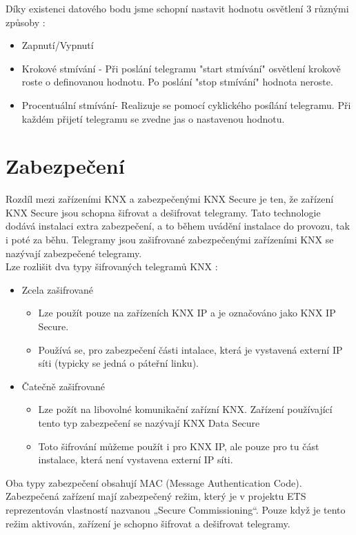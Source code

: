 Díky existenci datového bodu jsme schopní nastavit hodnotu osvětlení 3 různými způsoby \cite{Systemove Argumenty}:
\begin{itemize}
    \item Zapnutí/Vypnutí
    \item Krokové stmívání - Při poslání telegramu "start stmívání" osvětlení krokově roste o definovanou hodnotu. Po poslání "stop stmívání" hodnota neroste.
    \item Procentuální stmívání- Realizuje se pomocí cyklického posílání telegramu. Při každém přijetí telegramu se zvedne jas o nastavenou hodnotu.
\end{itemize}

\section{Zabezpečení}
Rozdíl mezi zařízeními KNX a zabezpečenými KNX Secure je ten, že zařízení KNX Secure jsou schopna šifrovat a dešifrovat telegramy. Tato technologie dodává instalaci extra zabezpečení, a to během uvádění instalace do provozu, tak i poté za běhu. Telegramy jsou zašifrované zabezpečenými zařízeními KNX se nazývají zabezpečené telegramy.
\\Lze rozlišit dva typy šifrovaných telegramů KNX \cite{KNX Secure}:
\begin{itemize}
\item{Zcela zašifrované}
\begin{itemize}
\item{Lze použít pouze na zařízeních KNX IP a je označováno jako KNX IP Secure.}
\item{Používá se, pro zabezpečení části intalace, která je vystavená externí IP síti (typicky se jedná o páteřní linku).}
\end{itemize}
\item{Čatečně zašifrované}
\begin{itemize}
\item{Lze požít na libovolné komunikační zařízní KNX. Zařízení používající tento typ zabezpečení se nazývají KNX Data Secure}
\item{Toto šifrování můžeme použít i pro KNX IP, ale pouze pro tu část instalace, která není vystavena externí IP síti.}
\end{itemize}
\end{itemize}
Oba typy zabezpečení obsahují MAC (Message Authentication Code).
\\Zabezpečená zařízení mají zabezpečený režim, který je v projektu ETS reprezentován vlastností nazvanou „Secure Commissioning“. Pouze když je tento režim aktivován, zařízení je schopno šifrovat a dešifrovat telegramy.

